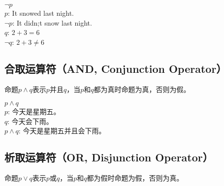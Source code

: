 \documentclass[12pt, openany, oneside]{book}
\begin{document}
\begin{tcolorbox}
    $ \neg p $ \\
    $ p $: It snowed last night. \\
    $ \neg p $: It didn;t snow last night. \\
    $ q $: $ 2 + 3 = 6 $ \\
    $ \neg q $: $ 2 + 3 \ne 6 $
\end{tcolorbox}

\subsection{合取运算符（AND, Conjunction Operator）}

命题$ p \wedge q $表示$ p $并且$ q $，当$ p $和$ q $都为真时命题为真，否则为假。

\begin{table}[H]
    \centering
    \caption{AND真值表}
\end{table}

\begin{tcolorbox}
    $ p \wedge q $ \\
    $ p $: 今天是星期五。 \\
    $ q $: 今天会下雨。 \\
    $ p \wedge q $: 今天是星期五并且会下雨。
\end{tcolorbox}

\subsection{析取运算符（OR, Disjunction Operator）}

命题$ p \vee q $表示$ p $或$ q $，当$ p $和$ q $都为假时命题为假，否则为真。

\begin{table}[H]
    \centering
    \caption{OR真值表}
\end{table}
\end{document}
